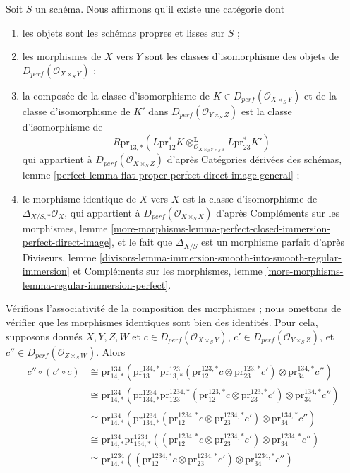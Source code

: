 \noindent
Soit $S$ un schéma. Nous affirmons qu'il existe une catégorie
dont
\begin{enumerate}
\item les objets sont les schémas propres et lisses sur $S$ ;
\item les morphismes de $X$ vers $Y$ sont les classes d'isomorphisme
des objets de $D_{perf}(\mathcal{O}_{X \times_S Y})$ ;
\item la composée de la classe d'isomorphisme de
$K \in D_{perf}(\mathcal{O}_{X \times_S Y})$
et de la classe d'isomorphisme de $K'$ dans $D_{perf}(\mathcal{O}_{Y \times_S Z})$
est la classe d'isomorphisme de
$$
R\text{pr}_{13, *}(
L\text{pr}_{12}^*K
\otimes_{\mathcal{O}_{X \times_S Y \times_S Z}}^\mathbf{L}
L\text{pr}_{23}^*K')
$$
qui appartient à $D_{perf}(\mathcal{O}_{X \times_S Z})$ d'après
Catégories dérivées des schémas, lemme
\ref{perfect-lemma-flat-proper-perfect-direct-image-general} ;
\item le morphisme identique de $X$ vers $X$ est la
classe d'isomorphisme de $\Delta_{X/S, *}\mathcal{O}_X$,
qui appartient à $D_{perf}(\mathcal{O}_{X \times_S X})$
d'après Compléments sur les morphismes, lemme
\ref{more-morphisms-lemma-perfect-closed-immersion-perfect-direct-image},
et le fait que $\Delta_{X/S}$ est un morphisme parfait d'après
Diviseurs, lemme
\ref{divisors-lemma-immersion-smooth-into-smooth-regular-immersion} et
Compléments sur les morphismes, lemme \ref{more-morphisms-lemma-regular-immersion-perfect}.
\end{enumerate}
Vérifions l'associativité de la composition
des morphismes ; nous omettons de vérifier que les morphismes identiques
sont bien des identités. Pour cela, supposons donnés
$X, Y, Z, W$ et
$c \in D_{perf}(\mathcal{O}_{X \times_S Y})$,
$c' \in D_{perf}(\mathcal{O}_{Y \times_S Z})$, et
$c'' \in D_{perf}(\mathcal{O}_{Z \times_S W})$. Alors
\begin{align*}
c'' \circ (c' \circ c)
& \cong
\text{pr}^{134}_{14, *}(
\text{pr}^{134, *}_{13}
\text{pr}^{123}_{13, *}(\text{pr}^{123, *}_{12}c \otimes
\text{pr}^{123, *}_{23}c')
\otimes \text{pr}^{134, *}_{34}c'') \\
& \cong
\text{pr}^{134}_{14, *}(
\text{pr}^{1234}_{134, *}
\text{pr}^{1234, *}_{123}(\text{pr}^{123, *}_{12}c \otimes
\text{pr}^{123, *}_{23}c')
\otimes \text{pr}^{134, *}_{34}c'') \\
& \cong
\text{pr}^{134}_{14, *}(
\text{pr}^{1234}_{134, *}
(\text{pr}^{1234, *}_{12}c \otimes
\text{pr}^{1234, *}_{23}c')
\otimes \text{pr}^{134, *}_{34}c'') \\
& \cong
\text{pr}^{134}_{14, *}
\text{pr}^{1234}_{134, *}
((\text{pr}^{1234, *}_{12}c \otimes
\text{pr}^{1234, *}_{23}c')
\otimes \text{pr}^{1234, *}_{34}c'') \\
& \cong
\text{pr}^{1234}_{14, *}(
(\text{pr}^{1234, *}_{12}c \otimes
\text{pr}^{1234, *}_{23}c') \otimes
\text{pr}^{1234, *}_{34}c'')
\end{align*}
